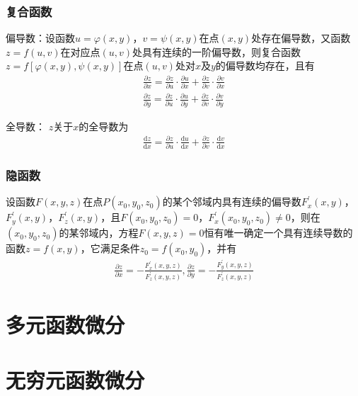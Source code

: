 \documentclass[12pt]{book}
\begin{document}
\subsubsection{复合函数}

偏导数：设函数$ u=\varphi(x,y) $，$ v=\psi (x,y) $在点$ (x,y) $处存在偏导数，又函数$ z=f(u,v) $在对应点$ (u,v) $处具有连续的一阶偏导数，则复合函数$ z=f[\varphi(x,y),\psi(x,y)] $在点$ (u,v) $处对$ x $及$ y $的偏导数均存在，且有
\begin{gather*}
    \frac{\partial z}{\partial x}=\frac{\partial z}{\partial u}\cdot \frac{\partial u}{\partial x}+\frac{\partial z}{\partial v}\cdot \frac{\partial v}{\partial x}\\
    \frac{\partial z}{\partial y}=\frac{\partial z}{\partial u}\cdot \frac{\partial u}{\partial y }+\frac{\partial z}{\partial v}\cdot \frac{\partial v}{\partial y} 
\end{gather*}
 

全导数： $z $关于$ x $的全导数为
\begin{gather*}
    \frac{\mathrm{d}z}{\mathrm{d}x} = \frac{\partial z}{\partial u}\cdot\frac{\mathrm{d}u}{\mathrm{d}x}+ \frac{\partial z}{\partial v}\cdot\frac{\mathrm{d}v}{\mathrm{d}x} 
\end{gather*}
 

\subsubsection{隐函数}


设函数$F(x,y,z)$在点$P(x_0,y_0,z_0)$的某个邻域内具有连续的偏导数$F^{\prime}_{x}(x,y)$，$F^{\prime}_{y}(x,y)$，$F^{\prime}_{z}(x,y)$，且$F(x_0,y_0,z_0)=0$，$F^{\prime}_{x}(x_0,y_0,z_0)\neq 0$，则在$(x_0,y_0,z_0)$的某邻域内，方程$F(x,y,z)=0$恒有唯一确定一个具有连续导数的函数$z=f(x,y)$，它满足条件$z_{0}=f(x_0,y_0)$，并有
\begin{gather*}
    \frac{\partial{z}}{\partial{x}}=-\frac{F^{\prime}_{x}(x,y,z)}{F^{\prime}_{z}(x,y,z)},
    \frac{\partial{z}}{\partial{y}}=-\frac{F^{\prime}_{y}(x,y,z)}{F^{\prime}_{z}(x,y,z)}
\end{gather*}




\section{多元函数微分}


\section{无穷元函数微分}
\end{document}
